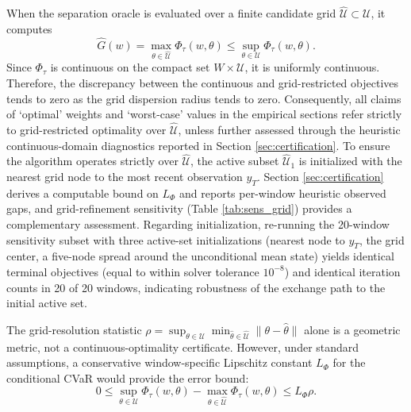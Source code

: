 \documentclass[smallextended]{svjour3}
\begin{document}
\begin{remark}
When the separation oracle is evaluated over a finite candidate grid $\widehat{\mathcal{U}} \subset \mathcal{U}$, it computes
\begin{equation}
\widehat{G}(w) = \max_{\theta \in \widehat{\mathcal{U}}} \Phi_\tau(w, \theta) \le \sup_{\theta \in \mathcal{U}} \Phi_\tau(w, \theta).
\end{equation}
Since $\Phi_\tau$ is continuous on the compact set $W \times \mathcal{U}$, it is uniformly continuous. Therefore, the discrepancy between the continuous and grid-restricted objectives tends to zero as the grid dispersion radius tends to zero. Consequently, all claims of `optimal' weights and `worst-case' values in the empirical sections refer strictly to grid-restricted optimality over $\widehat{\mathcal{U}}$, unless further assessed through the heuristic continuous-domain diagnostics reported in Section \ref{sec:certification}. To ensure the algorithm operates strictly over $\widehat{\mathcal{U}}$, the active subset $\widehat{\mathcal{U}}_1$ is initialized with the nearest grid node to the most recent observation $y_T$. Section \ref{sec:certification} derives a computable bound on $L_\Phi$ and reports per-window heuristic observed gaps, and grid-refinement sensitivity (Table \ref{tab:sens_grid}) provides a complementary assessment. Regarding initialization, re-running the 20-window sensitivity subset with three active-set initializations (nearest node to $y_T$, the grid center, a five-node spread around the unconditional mean state) yields identical terminal objectives (equal to within solver tolerance $10^{-8}$) and identical iteration counts in 20 of 20 windows, indicating robustness of the exchange path to the initial active set.


The grid-resolution statistic $\rho = \sup_{\theta \in \mathcal{U}} \min_{\hat{\theta} \in \widehat{\mathcal{U}}} \|\theta - \hat{\theta}\|$ alone is a geometric metric, not a continuous-optimality certificate. However, under standard assumptions, a conservative window-specific Lipschitz constant $L_\Phi$ for the conditional CVaR would provide the error bound:
\begin{equation}
0 \le \sup_{\theta \in \mathcal{U}} \Phi_\tau(w, \theta) - \max_{\theta \in \widehat{\mathcal{U}}} \Phi_\tau(w, \theta) \le L_\Phi \rho.
\end{equation}


\end{remark}
\end{document}
